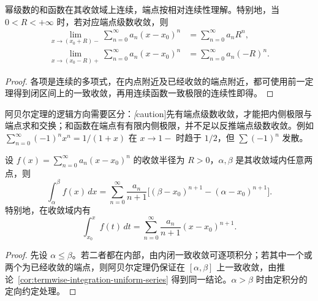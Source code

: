 \documentclass[UTF8,12pt,a4paper,fontset=fandol]{ctexbook}
\begin{document}
\begin{corollary}[和函数的连续性与端点极限]
\label{cor:power-series-continuity-and-abel-limits}
幂级数的和函数在其收敛域上连续，端点按相对连续性理解。特别地，当 $0<R<+\infty$ 时，若对应端点级数收敛，则
\begin{align}
    \lim_{x\to(x_0+R)-}\sum_{n=0}^\infty a_n(x-x_0)^n
        &=\sum_{n=0}^\infty a_nR^n,
        \label{eq:abel-right-endpoint-limit}\\
    \lim_{x\to(x_0-R)+}\sum_{n=0}^\infty a_n(x-x_0)^n
        &=\sum_{n=0}^\infty a_n(-R)^n.
        \label{eq:abel-left-endpoint-limit}
\end{align}
\end{corollary}

\begin{proof}
各项是连续的多项式，在内点附近及已经收敛的端点附近，都可使用前一定理得到闭区间上的一致收敛，再用连续函数一致极限的连续性即得。
\end{proof}

阿贝尔定理的逻辑方向需要区分：\emph[caution]{先有端点级数收敛，才能把内侧极限与端点求和交换；和函数在端点有有限内侧极限，并不足以反推端点级数收敛。}例如 $\sum_{n=0}^\infty(-1)^nx^n=1/(1+x)$ 在 $x\to1-$ 时趋于 $1/2$，但 $\sum(-1)^n$ 发散。

\begin{theorem}[逐项积分]
\label{thm:power-series-termwise-integration}
设 $f(x)=\sum_{n=0}^\infty a_n(x-x_0)^n$ 的收敛半径为 $R>0$，$\alpha,\beta$ 是其收敛域内任意两点，则
\begin{equation}
    \int_\alpha^\beta f(x)\,dx
    =\sum_{n=0}^\infty
       \frac{a_n}{n+1}
       \bigl[(\beta-x_0)^{n+1}-(\alpha-x_0)^{n+1}\bigr].
    \label{eq:power-series-integral-between-convergence-points}
\end{equation}
特别地，在收敛域内有
\begin{equation}
    \int_{x_0}^x f(t)\,dt
       =\sum_{n=0}^\infty\frac{a_n}{n+1}(x-x_0)^{n+1}.
    \label{eq:power-series-integral-from-center}
\end{equation}
\end{theorem}

\begin{proof}
先设 $\alpha\leq\beta$。若二者都在内部，由内闭一致收敛可逐项积分；若其中一个或两个为已经收敛的端点，则阿贝尔定理仍保证在 $[\alpha,\beta]$ 上一致收敛，由推论~\ref{cor:termwise-integration-uniform-series} 得到同一结论。$\alpha>\beta$ 时由定积分的定向约定处理。
\end{proof}
\end{document}
